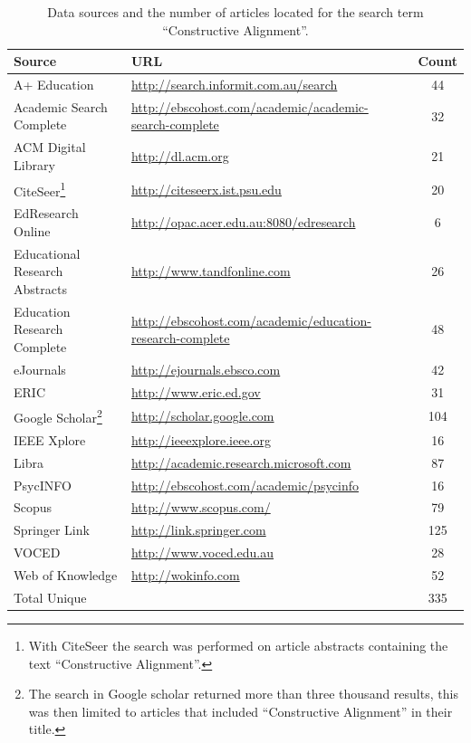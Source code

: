 \begin{savenotes}
\begin{table}[htb]
	\centering
	\caption{Data sources and the number of articles located for the search term ``Constructive Alignment''.}
	\label{tbl:review_source}
	\footnotesize
    \begin{tabular}{l|l|c}
    \textbf{Source} & \textbf{URL} & \textbf{Count} \\ \hline
    A+ Education & \url{http://search.informit.com.au/search} & 44 \\
    Academic Search Complete & \scriptsize \url{http://ebscohost.com/academic/academic-search-complete} & 32 \\
    ACM Digital Library & \url{http://dl.acm.org} & 21 \\
    CiteSeer\footnote{With CiteSeer the search was performed on article abstracts containing the text ``Constructive Alignment''.}  & \url{http://citeseerx.ist.psu.edu} & 20 \\
    EdResearch Online & \url{http://opac.acer.edu.au:8080/edresearch} & 6 \\
    \scriptsize Educational Research Abstracts & \url{http://www.tandfonline.com} & 26 \\
    \scriptsize Education Research Complete & \scriptsize \url{http://ebscohost.com/academic/education-research-complete} & 48 \\
    eJournals & \url{http://ejournals.ebsco.com} & 42 \\
    ERIC & \url{http://www.eric.ed.gov} & 31 \\
    Google Scholar\footnote{The search in Google scholar returned more than three thousand results, this was then limited to articles that included ``Constructive Alignment'' in their title.} & \url{http://scholar.google.com} & 104 \\
    IEEE Xplore & \url{http://ieeexplore.ieee.org} & 16 \\
    Libra & \url{http://academic.research.microsoft.com} & 87\\
	PsycINFO & \url{http://ebscohost.com/academic/psycinfo} & 16 \\
	Scopus & \url{http://www.scopus.com/} & 79 \\
	Springer Link & \url{http://link.springer.com} & 125 \\
	VOCED & \url{http://www.voced.edu.au} & 28 \\
	Web of Knowledge & \url{http://wokinfo.com} & 52 \\ \hline
	Total Unique & & 335 \\
    \end{tabular}
\end{table}
\end{savenotes}

